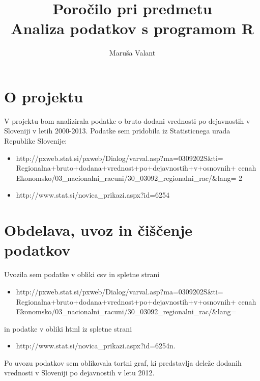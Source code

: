 \documentclass[11pt,a4paper]{article}
\begin{document}
\title{Poročilo pri predmetu \\
Analiza podatkov s programom R}
\author{Maruša Valant}

\section{O projektu}

V projektu bom analizirala podatke o bruto dodani vrednosti po dejavnostih
v Sloveniji v letih 2000-2013. Podatke sem pridobila iz Statisticnega urada
Republike Slovenije:
\begin{itemize}
\item{http://pxweb.stat.si/pxweb/Dialog/varval.asp?ma=0309202S&ti=
Regionalna+bruto+dodana+vrednost+po+dejavnostih+v+osnovnih+
cenah%
Ekonomsko/03_nacionalni_racuni/30_03092_regionalni_rac/&lang=
2}
\item{http://www.stat.si/novica_prikazi.aspx?id=6254}
\end{itemize}
\section{Obdelava, uvoz in čiščenje podatkov}
Uvozila sem podatke v obliki csv in spletne strani
\begin{itemize}
\item{http://pxweb.stat.si/pxweb/Dialog/varval.asp?ma=0309202S&ti=
Regionalna+bruto+dodana+vrednost+po+dejavnostih+v+osnovnih+
cenah%
Ekonomsko/03_nacionalni_racuni/30_03092_regionalni_rac/&lang=}
\end{itemize}
in podatke v obliki html iz spletne strani
\begin{itemize}
\item{http://www.stat.si/novica_prikazi.aspx?id=6254n}.
\end{itemize}

Po uvozu podatkov sem oblikovala tortni graf, ki predstavlja deleže dodanih
vrednosti v Sloveniji po dejavnostih v letu 2012.
\end{document}
